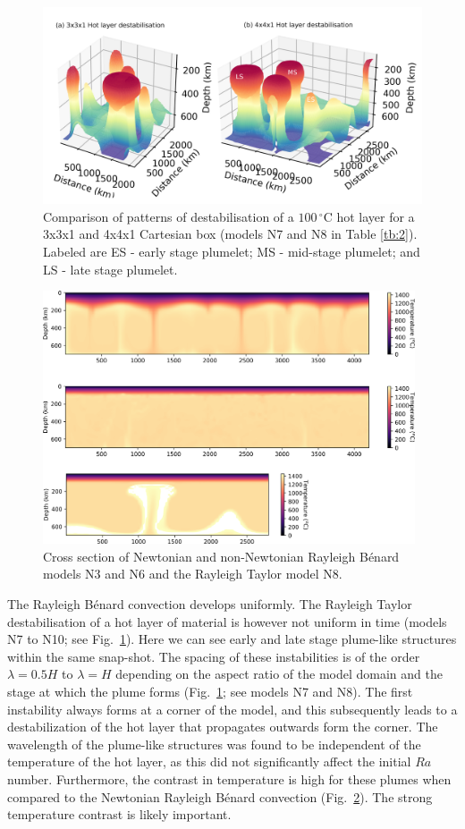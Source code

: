 \documentclass[a4paper,10pt,twocolumn]{paper}
\begin{document}
\begin{figure}
\centering
\includegraphics[width=16cm]{../figures-working/comparison-3x4-lables.png}
\caption{Comparison of patterns of destabilisation of a $100\,^{\circ}$C hot layer for a 3x3x1 and 4x4x1 Cartesian box (models N7 and N8 in Table \ref{tb:2}). Labeled are ES - early stage plumelet; MS - mid-stage plumelet; and LS - late stage plumelet.}
\label{fg:4}
\end{figure}

\begin{figure}
\centering
\includegraphics[width=11cm]{../figures-working/temperatures.png}
\caption{Cross section of Newtonian and non-Newtonian Rayleigh B{\'e}nard models N3 and N6 and the Rayleigh Taylor model N8.}
\label{fg:5}
\end{figure}

The Rayleigh B{\'e}nard convection develops uniformly. The Rayleigh Taylor destabilisation of a hot layer of material is however not uniform in time (models N7 to N10; see Fig.~\ref{fg:4}). Here we can see early and late stage plume-like structures within the same snap-shot. The spacing of these instabilities is of the order $\lambda = 0.5H$ to $\lambda = H$ depending on the aspect ratio of the model domain and the stage at which the plume forms (Fig.~\ref{fg:4}; see models N7 and N8). The first instability always forms at a corner of the model, and this subsequently leads to a destabilization of the hot layer that propagates outwards form the corner. The wavelength of the plume-like structures was found to be independent of the temperature of the hot layer, as this did not significantly affect the initial $Ra$ number. Furthermore, the contrast in temperature is high for these plumes when compared to the Newtonian Rayleigh B{\'e}nard convection (Fig.~\ref{fg:5}). The strong temperature contrast is likely important.
\end{document}
